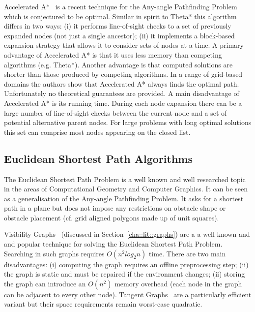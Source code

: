Accelerated A{*}~\citep{sislak09a,sislak09b} is a recent technique for the
Any-angle Pathfinding Problem which is conjectured to be optimal. Similar in
spirit to Theta{*} this algorithm differs in two ways: (i) it performs
line-of-sight checks to a set of previously expanded nodes (not just a single
ancestor); (ii) it implements a block-based expansion strategy that allows it
to consider sets of nodes at a time.  A primary advantage of Accelerated A{*} is
that it uses less memory than competing algorithms (e.g.  Theta{*}).  Another
advantage is that computed solutions are shorter than those produced by
competing algorithms. In a range of grid-based domains the authors show that
Accelerated A{*} always finds the optimal path.  Unfortunately no theoretical
guarantees are provided.  A main disadvantage of Accelerated A{*} is its
running time. During each node expansion there can be a large number of
line-of-sight checks between the current node and a set of potential
alternative parent nodes.  For large problems with long optimal solutions this
set can comprise most nodes appearing on the closed list.


\subsection{Euclidean Shortest Path Algorithms}
\label{cha::lit::euclidean::euclidean}
The Euclidean Shortest Path Problem is a well known and well researched topic
in the areas of Computational Geometry and Computer Graphics. It can be seen
as a generalisation of the Any-angle Pathfinding Problem. It asks for a
shortest path in a plane but does not impose any restrictions on obstacle
shape or obstacle placement (cf. grid aligned polygons made up of unit
squares).

Visibility Graphs~\citep{lozanoperez79} (discussed in
Section~\ref{cha::lit::graphs}) are a a well-known and and popular technique
for solving the Euclidean Shortest Path Problem. Searching in such graphs
requires $O(n^2log_{2}{n})$ time.  There are two main disadvantages: (i)
computing the graph requires an offline preprocessing step; (ii) the graph is
static and must be repaired if the environment changes; (ii) storing the graph
can introduce an $O(n^2)$ memory overhead (each node in the graph can be adjacent
to every other node). Tangent Graphs~\citep{liu92} are a particularly
efficient variant but their space requirements remain worst-case quadratic.

